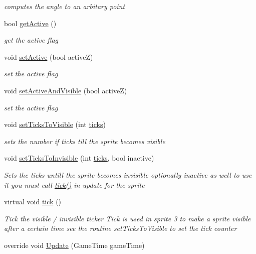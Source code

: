 \begin{DoxyCompactItemize}
\begin{DoxyCompactList}\small\item\em computes the angle to an arbitary point \end{DoxyCompactList}\item 
bool \mbox{\hyperlink{class_r_c___framework_1_1_sprite3_af3c0f0e95f498147b74322f3ef919005}{get\+Active}} ()
\begin{DoxyCompactList}\small\item\em get the active flag \end{DoxyCompactList}\item 
void \mbox{\hyperlink{class_r_c___framework_1_1_sprite3_a6e007701b261f3c293389e5094513faf}{set\+Active}} (bool activeZ)
\begin{DoxyCompactList}\small\item\em set the active flag \end{DoxyCompactList}\item 
void \mbox{\hyperlink{class_r_c___framework_1_1_sprite3_a9299af8d2e5277dd0e810389a7ed831c}{set\+Active\+And\+Visible}} (bool activeZ)
\begin{DoxyCompactList}\small\item\em set the active flag \end{DoxyCompactList}\item 
void \mbox{\hyperlink{class_r_c___framework_1_1_sprite3_ab849638ba60bac0f9accbd4091f95d1e}{set\+Ticks\+To\+Visible}} (int \mbox{\hyperlink{class_r_c___framework_1_1_sprite3_a59474528cccad4b750e2b72a5f8cf585}{ticks}})
\begin{DoxyCompactList}\small\item\em sets the number if ticks till the sprite becomes visible \end{DoxyCompactList}\item 
void \mbox{\hyperlink{class_r_c___framework_1_1_sprite3_abb634dc79e4094b58b566ef7d8aca35b}{set\+Ticks\+To\+Invisible}} (int \mbox{\hyperlink{class_r_c___framework_1_1_sprite3_a59474528cccad4b750e2b72a5f8cf585}{ticks}}, bool inactive)
\begin{DoxyCompactList}\small\item\em Sets the ticks untill the sprite becomes invisible optionally inactive as well to use it you must call \mbox{\hyperlink{class_r_c___framework_1_1_sprite3_aa6a483f4fdcd1ed260bd72f60a07834d}{tick()}} in update for the sprite \end{DoxyCompactList}\item 
virtual void \mbox{\hyperlink{class_r_c___framework_1_1_sprite3_aa6a483f4fdcd1ed260bd72f60a07834d}{tick}} ()
\begin{DoxyCompactList}\small\item\em Tick the visible / invisible ticker Tick is used in sprite 3 to make a sprite visible after a certain time see the routine set\+Ticks\+To\+Visible to set the tick counter \end{DoxyCompactList}\item 
override void \mbox{\hyperlink{class_r_c___framework_1_1_sprite3_a5473d37c4f1f44fa1685dd64c82dfd8c}{Update}} (Game\+Time game\+Time)
\end{DoxyCompactItemize}
